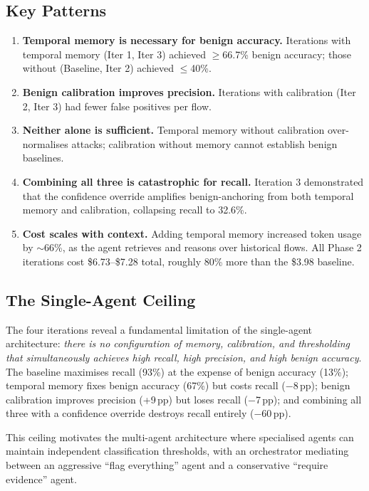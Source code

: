 \documentclass[12pt, a4paper, oneside]{report}
\begin{document}
\subsection{Key Patterns}

\begin{enumerate}
  \item \textbf{Temporal memory is necessary for benign accuracy.} Iterations
        with temporal memory (Iter 1, Iter 3) achieved $\geq$66.7\% benign
        accuracy; those without (Baseline, Iter 2) achieved $\leq$40\%.
  \item \textbf{Benign calibration improves precision.} Iterations with
        calibration (Iter 2, Iter 3) had fewer false positives per flow.
  \item \textbf{Neither alone is sufficient.} Temporal memory without
        calibration over-normalises attacks; calibration without memory cannot
        establish benign baselines.
  \item \textbf{Combining all three is catastrophic for recall.} Iteration 3
        demonstrated that the confidence override amplifies benign-anchoring
        from both temporal memory and calibration, collapsing recall to 32.6\%.
  \item \textbf{Cost scales with context.} Adding temporal memory increased
        token usage by $\sim$66\%, as the agent retrieves and reasons over
        historical flows. All Phase 2 iterations cost \$6.73--\$7.28 total,
        roughly 80\% more than the \$3.98 baseline.
\end{enumerate}

\subsection{The Single-Agent Ceiling}

The four iterations reveal a fundamental limitation of the single-agent
architecture: \emph{there is no configuration of memory, calibration, and
thresholding that simultaneously achieves high recall, high precision, and
high benign accuracy}. The baseline maximises recall (93\%) at the expense of
benign accuracy (13\%); temporal memory fixes benign accuracy (67\%) but
costs recall ($-$8\,pp); benign calibration improves precision (+9\,pp) but
loses recall ($-$7\,pp); and combining all three with a confidence override
destroys recall entirely ($-$60\,pp).

This ceiling motivates the multi-agent architecture where specialised agents
can maintain independent classification thresholds, with an orchestrator
mediating between an aggressive ``flag everything'' agent and a conservative
``require evidence'' agent.
\end{document}

